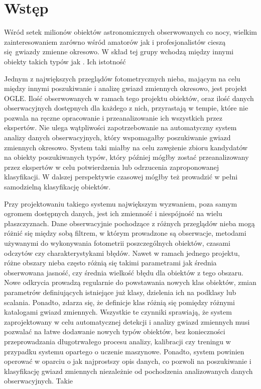 \documentclass{pracalicmgr}
\begin{document}
	\section{Wstęp}
    Wśród setek milionów obiektów astronomicznych obserwowanych co nocy, wielkim zainteresowaniem zarówno wśród amatorów jak i profesjonalistów cieszą się gwiazdy zmienne okresowo. W skład tej grupy wchodzą między innymi obiekty takich typów jak . Ich istotność 
    
    Jednym z największych przeglądów fotometrycznych nieba, mającym na celu między innymi poszukiwanie i analizę gwiazd zmiennych okresowo, jest projekt OGLE. Ilość obserwowanych w ramach tego projektu obiektów, oraz ilość danych obserwacyjnych dostępnych dla każdego z nich, przyrastają w tempie, które nie pozwala na ręczne opracowanie i przeanalizowanie ich wszystkich przez ekspertów. Nie ulega wątpliwości zapotrzebowanie na automatyczny system analizy danych obserwacyjnych, który wspomagałby poszukiwanie gwiazd zmiennych okresowo. System taki miałby na celu zawężenie zbioru kandydatów na obiekty poszukiwanych typów, który później mógłby zostać przeanalizowany przez ekspertów w celu potwierdzenia lub odrzucenia zaproponowanej klasyfikacji. W dalszej perspektywie czasowej mógłby też prowadzić w pełni samodzielną klasyfikację obiektów.
    
    Przy projektowaniu takiego systemu największym wyzwaniem, poza samym ogromem dostępnych danych, jest ich zmienność i niespójność na wielu płaszczyznach. Dane obserwacyjnie pochodzące z różnych przeglądów nieba mogą różnić się między sobą filtrem, w którym prowadzone są obserwacje, metodami używanymi do wykonywania fotometrii poszczególnych obiektów, czasami odczytów czy charakterystykami błędów. Nawet w ramach jednego projektu, różne obszary nieba często różnią się takimi parametrami jak średnia obserwowana jasność, czy średnia wielkość błędu dla obiektów z tego obszaru. Nowe odkrycia prowadzą regularnie do powstawania nowych klas obiektów, zmian parametrów definiujących istniejące już klasy, dzielenia ich na podklasy lub scalania. Ponadto, zdarza się, że definicje klas różnią się pomiędzy różnymi katalogami gwiazd zmiennych. Wszystkie te czynniki sprawiają, że system zaprojektowany w celu automatycznej detekcji i analizy gwiazd zmiennych musi pozwalać na łatwe dodawanie nowych typów obiektów, bez konieczności przeprowadzania długotrwałego procesu analizy, kalibracji czy treningu w przypadku systemu opartego o uczenie maszynowe. Ponadto, system powinien operować w oparciu o jak najprostszy opis danych, co pozwoli na poszukiwanie i klasyfikację gwiazd zmiennych niezależnie od pochodzenia analizowanych danych obserwacyjnych. Takie 
    
\end{document}

